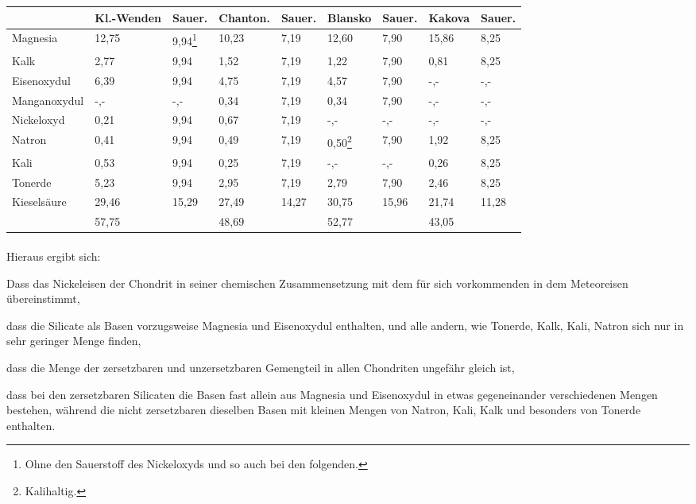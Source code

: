 \documentclass[a4paper, 11pt, oneside]{article}
\begin{document}
\begin{center}
\begin{tabular}{ |p{23mm}|p{12mm}|p{9mm}|p{13mm}|p{8mm}|p{11mm}|p{8mm}|p{10mm}|p{8mm}| }
    \hline
     & Kl.-Wenden & Sauer. & Chanton. & Sauer. & Blansko & Sauer. & Kakova & Sauer.\\
    \hline\hline
    Magnesia & 12,75 & 9,94\footnote{Ohne den Sauerstoff des Nickeloxyds und so auch bei den folgenden.} & 10,23 & 7,19 & 12,60 & 7,90 & 15,86 & 8,25\\\hline
    Kalk & 2,77 & 9,94 & 1,52 & 7,19 & 1,22 & 7,90 & 0,81 & 8,25\\\hline
    Eisenoxydul & 6,39 & 9,94 & 4,75 & 7,19 & 4,57 & 7,90 & -,- & -,-\\\hline
    Manganoxydul & -,- & -,- & 0,34 & 7,19 & 0,34 & 7,90 & -,- & -,-\\\hline
    Nickeloxyd & 0,21 & 9,94 & 0,67 & 7,19 & -,- & -,- & -,- & -,-\\\hline
    Natron & 0,41 & 9,94 & 0,49 & 7,19 & 0,50\footnote{Kalihaltig.} & 7,90 & 1,92 & 8,25\\\hline
    Kali & 0,53 & 9,94 & 0,25 & 7,19 & -,- & -,- & 0,26 & 8,25\\\hline
    Tonerde & 5,23 & 9,94 & 2,95 & 7,19 & 2,79 & 7,90 & 2,46 & 8,25\\\hline
    Kieselsäure & 29,46 & 15,29 & 27,49 & 14,27 & 30,75 & 15,96 & 21,74 & 11,28\\\hline
     & 57,75 & & 48,69 & & 52,77 & & 43,05 & \\
    \hline
\end{tabular}
\end{center}
\vspace{\medskipamount}
\paragraph{}
Hieraus ergibt sich:

Dass das Nickeleisen der Chondrit in seiner chemischen Zusammensetzung mit dem für sich vorkommenden in dem Meteoreisen übereinstimmt, 

dass die Silicate als Basen vorzugsweise Magnesia und Eisenoxydul enthalten, und alle andern, wie Tonerde, Kalk, Kali, Natron sich nur in sehr geringer Menge finden,

dass die Menge der zersetzbaren und unzersetzbaren Gemengteil in allen Chondriten ungefähr gleich ist,

dass bei den zersetzbaren Silicaten die Basen fast allein aus Magnesia und Eisenoxydul in etwas gegeneinander verschiedenen Mengen bestehen, während die nicht zersetzbaren dieselben Basen mit kleinen Mengen von Natron, Kali, Kalk und besonders von Tonerde enthalten.
\end{document}
